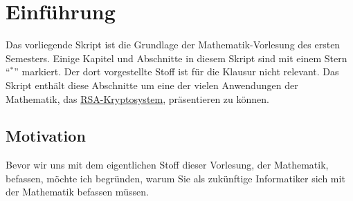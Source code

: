 \chapter{Einf\"{u}hrung}
Das vorliegende Skript ist die Grundlage der Mathematik-Vorlesung des ersten Semesters.
Einige Kapitel und Abschnitte in diesem Skript sind mit einem Stern ``$^*$'' markiert.  
Der dort vorgestellte Stoff ist f\"{u}r die Klausur nicht relevant.  Das Skript enth\"{a}lt diese Abschnitte
um eine der vielen Anwendungen der Mathematik, das \href{https://de.wikipedia.org/wiki/RSA-Kryptosystem}{RSA-Kryptosystem}, pr\"{a}sentieren zu k\"{o}nnen.  

\section{Motivation}
Bevor wir uns mit dem eigentlichen Stoff dieser Vorlesung, der Mathematik, befassen, m\"{o}chte ich
begr\"{u}nden, warum Sie als zuk\"{u}nftige Informatiker sich mit der Mathematik befassen m\"{u}ssen.  
